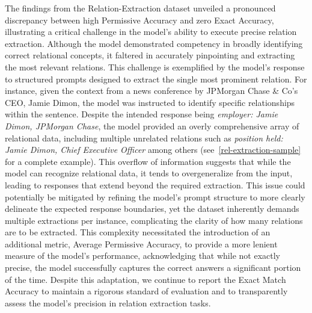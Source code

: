 \documentclass[logo,msc]{infthesis}           %
\begin{document}
The findings from the Relation-Extraction dataset unveiled a pronounced discrepancy between high Permissive Accuracy and zero Exact Accuracy, illustrating a critical challenge in the model's ability to execute precise relation extraction. Although the model demonstrated competency in broadly identifying correct relational concepts, it faltered in accurately pinpointing and extracting the most relevant relations. This challenge is exemplified by the model's response to structured prompts designed to extract the single most prominent relation. For instance, given the context from a news conference by JPMorgan Chase & Co's CEO, Jamie Dimon, the model was instructed to identify specific relationships within the sentence. Despite the intended response being \emph{employer: Jamie Dimon, JPMorgan Chase}, the model provided an overly comprehensive array of relational data, including multiple unrelated relations such as \emph{position held: Jamie Dimon, Chief Executive Officer} among others (see~\ref{rel-extraction-sample} for a complete example). This overflow of information suggests that while the model can recognize relational data, it tends to overgeneralize from the input, leading to responses that extend beyond the required extraction. This issue could potentially be mitigated by refining the model's prompt structure to more clearly delineate the expected response boundaries, yet the dataset inherently demands multiple extractions per instance, complicating the clarity of how many relations are to be extracted. This complexity necessitated the introduction of an additional metric, Average Permissive Accuracy, to provide a more lenient measure of the model's performance, acknowledging that while not exactly precise, the model successfully captures the correct answers a significant portion of the time. Despite this adaptation, we continue to report the Exact Match Accuracy to maintain a rigorous standard of evaluation and to transparently assess the model's precision in relation extraction tasks.
\end{document}
